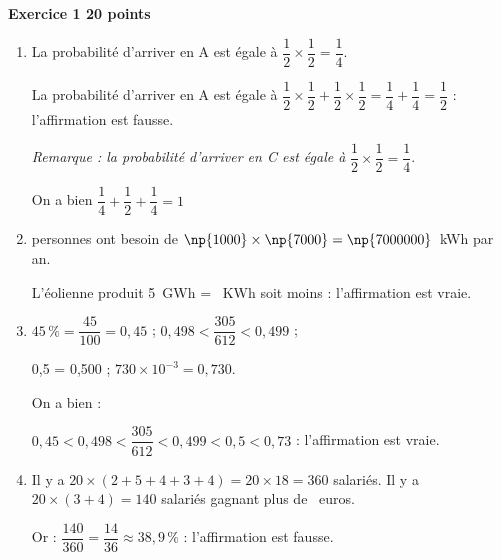 \textbf{Exercice 1 \hfill 20 points}

\medskip

\begin{enumerate}
\item La probabilité d'arriver en A est égale à $\dfrac{1}{2} \times \dfrac{1}{2} = \dfrac{1}{4}$.

La probabilité d'arriver en A est égale à $\dfrac{1}{2} \times \dfrac{1}{2} + \dfrac{1}{2} \times \dfrac{1}{2} = \dfrac{1}{4} + \dfrac{1}{4} = \dfrac{1}{2}$ : l'affirmation est fausse.

\emph{Remarque : la probabilité d'arriver en {\rm C} est égale à }$\dfrac{1}{2} \times \dfrac{1}{2} = \dfrac{1}{4}$.

On a bien  $\dfrac{1}{4} +  \dfrac{1}{2} +  \dfrac{1}{4} =  1$
\item {} personnes ont besoin de $\np{1000} \times \np{7000} = \np{7000000}$~kWh par an.

L'éolienne produit 5~GWh = ~KWh soit moins : l'affirmation est vraie.
\item $45\,\% = \dfrac{45}{100} = 0,45$ ; $0,498 < \dfrac{305}{612} < 0,499$ ;

0,5 = 0,500 ; $730 \times 10^{-3} = 0,730$.

On a bien :

$0,45 < 0,498 < \dfrac{305}{612}  < 0,499 < 0,5 < 0,73$ : l'affirmation est vraie.
\item Il y a $20 \times (2 + 5 + 4 + 3 + 4) = 20 \times 18 = 360$ salariés.
Il y a $ 20 \times (3 + 4) = 140$ salariés gagnant plus de ~euros.

Or : $\dfrac{140}{360}= \dfrac{14}{36} \approx 38,9\,\%$ : l'affirmation est fausse.
\end{enumerate}

\bigskip

